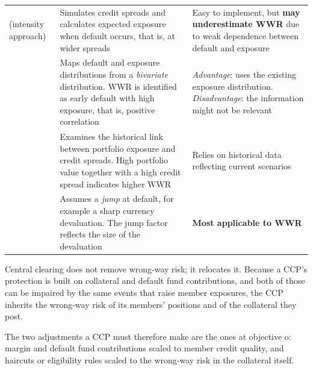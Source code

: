 \begin{center}
\footnotesize
\begin{tabular}{L{3.0cm} L{5.6cm} L{5.9cm}}
\toprule
{} &  &  \\
\midrule
{} \newline (intensity approach) &
  Simulates credit spreads and calculates expected exposure when default occurs,
  that is, at wider spreads &
  Easy to implement, but \textbf{may underestimate WWR} due to weak dependence
  between default and exposure \\
 &
  Maps default and exposure distributions from a \emph{bivariate} distribution.
  WWR is identified as early default with high exposure, that is, positive
  correlation &
  \emph{Advantage}: uses the existing exposure distribution.
  \emph{Disadvantage}: the information might not be relevant \\
 &
  Examines the historical link between portfolio exposure and credit spreads. High
  portfolio value together with a high credit spread indicates higher WWR &
  Relies on historical data reflecting current scenarios \\
 &
  Assumes a \emph{jump} at default, for example a sharp currency devaluation. The
  jump factor reflects the size of the devaluation &
  \textbf{Most applicable to WWR} \\
\bottomrule
\end{tabular}
\end{center}


Central clearing does not remove wrong-way risk; it relocates it. Because a CCP's
protection is built on collateral and default fund contributions, and both of
those can be impaired by the same events that raise member exposures, the CCP
inherits the wrong-way risk of its members' positions and of the collateral they
post.

The two adjustments a CCP must therefore make are the ones at objective o: margin
and default fund contributions scaled to member credit quality, and haircuts or
eligibility rules scaled to the wrong-way risk in the collateral itself.
